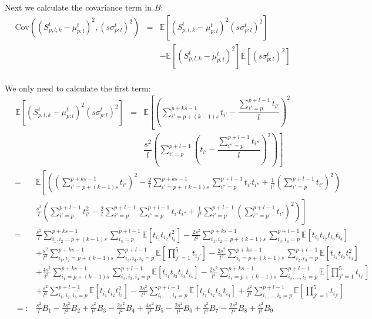 \documentclass[12pt,a4paper]{article}
\newcommand{\segsum}[3]{S_{#1,#2,#3}^t} %
\newcommand{\subsmean}[2]{\mu^t_{#1:#2}} %
\newcommand{\subsvar}[2]{\sigma^t_{#1:#2}} %
\newcommand{\expectation}[1]{\mathbb{E}\left[#1\right]} %
\newcommand{\covariance}[2]{\text{Cov}(#1,#2)} %
\newcommand{\segsumplk}{\segsum{p}{l}{k}} %
\newcommand{\subsmeanpl}{\subsmean{p}{l}} %
\newcommand{\subsvarpl}{\subsvar{p}{l}} %
\begin{document}
Next we calculate the covariance term in $B$:
$$\begin{array}{rcl}
    \covariance{(\segsumplk-\subsmeanpl)^2}{(s\subsvarpl)^2} & = & \expectation{(\segsumplk-\subsmeanpl)^2(s\subsvarpl)^2} \\[8pt]
    && - \expectation{(\segsumplk-\subsmeanpl)^2}\expectation{(s\subsvarpl)^2} \\[16pt]
\end{array}$$

We only need to calculate the first term:
$$\begin{array}{rcl}
    \expectation{(\segsumplk-\subsmeanpl)^2(s\subsvarpl)^2} & = & \mathbb{E}\left[\left(\sum_{i'=p+(k-1)s}^{p+ks-1}t_{i'} - \dfrac{\sum_{i'=p}^{p+l-1} t_{i'}}{l}\right)^2\right. \\[16pt]
    && \left. \dfrac{s^2}{l}\left(\sum_{i'=p}^{p+l-1}\left(t_{i'}-\dfrac{\sum_{i''=p}^{p+l-1} t_{i''}}{l}\right)^2\right) \right]   
\end{array}$$
$$\begin{array}{rcl}
    & = & \mathbb{E}\left[ \left( \left(\sum_{i'=p+(k-1)s}^{p+ks-1}t_{i'}\right)^2 - \frac{2}{l}\sum_{i'=p+(k-1)s}^{p+ks-1}\sum_{i''=p}^{p+l-1}t_{i'}t_{i''}+\frac{1}{l^2}\left(\sum_{i'=p}^{p+l-1}t_{i'}\right)^2\right) \right. \\[16pt]
    && \left. \frac{s^2}{l}\left(\sum_{i'=p}^{p+l-1}t_{i'}^2 - \frac{2}{l}\sum_{i'=p}^{p+l-1}\sum_{i''=p}^{p+l-1}t_{i'}t_{i''} + \frac{1}{l^2}\sum_{i'=p}^{p+l-1}\left(\sum_{i''=p}^{p+l-1}t_{i'}\right)^2\right)\right] \\ [16pt]
    & = & \frac{s^2}{l}\sum_{i_1,i_2=p+(k-1)s}^{p+ks-1}\sum_{i_3=p}^{p+l-1}\expectation{t_{i_1}t_{i_2}t_{i_3}^2} - \frac{2s^2}{l^2}\sum_{i_1,i_2=p+(k-1)s}^{p+ks-1}\sum_{i_3,i_4=p}^{p+l-1}\expectation{t_{i_1}t_{i_2}t_{i_3}t_{i_4}} \\[8pt]
    && + \frac{s^2}{l^3}\sum_{i_1,i_2=p+(k-1)s}^{p+ks-1}\sum_{i_3,i_4,i_5=p}^{p+l-1}\expectation{\prod_{j'=1}^5t_{i_j'}} - \frac{2s^2}{l^2}\sum_{i_1=p+(k-1)s}^{p+ks-1}\sum_{i_2,i_3=p}^{p+l-1}\expectation{t_{i_1}t_{i_2}t_{i_3}^2} \\[8pt]
    && + \frac{4s^2}{l^3}\sum_{i_1=p+(k-1)s}^{p+ks-1}\sum_{i_2,i_3,i_4=p}^{p+l-1}\expectation{t_{i_1}t_{i_2}t_{i_3}t_{i_4}} - \frac{2s^2}{l^4}\sum_{i_1=p+(k-1)s}^{p+ks-1}\sum_{i_2,...,i_5=p}^{p+l-1}\expectation{\prod_{j'=1}^5t_{i_{j'}}}\\[8pt]
    && + \frac{s^2}{l^3}\sum_{i_1,i_2,i_3=p}^{p+l-1}\expectation{t_{i_1}t_{i_2}t_{i_3}^2} - \frac{2s^2}{l^4}\sum_{i_1,...,i_4=p}^{p+l-1}\expectation{t_{i_1}t_{i_2}t_{i_3}t_{i_4}} + \frac{s^2}{l^5}\sum_{i_1,...,i_5=p}^{p+l-1}\expectation{\prod_{j'=1}^5t_{i_{j'}}} \\[8pt]
    & =: & \frac{s^2}{l}B_1 -\frac{2s^2}{l^2}B_2 + \frac{s^2}{l^3}B_3 - \frac{2s^2}{l^2}B_4 +\frac{4s^2}{l^3}B_5 - \frac{2s^2}{l^4}B_6 + \frac{s^2}{l^3}B_7 - \frac{2s^2}{l^4}B_8+ \frac{s^2}{l^5}B_9 
\end{array}$$
\end{document}
